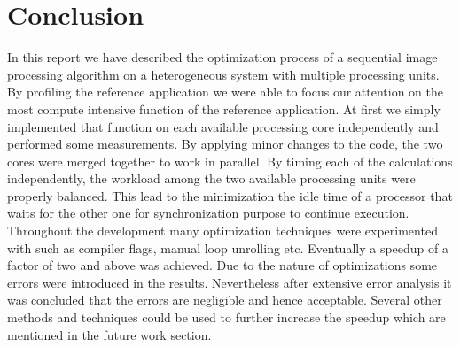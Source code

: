 \section{Conclusion}
\label{sec:Conclusion}
 In this report we have described the optimization process of a sequential image processing algorithm on a heterogeneous system with multiple processing units.
By profiling the reference application we were able to focus our attention on the most compute intensive function of the reference application.
At first we simply implemented that function on each available processing core independently and performed some measurements. By applying minor changes to the code, the two cores were merged together to work in parallel.
By timing each of the calculations independently, the workload among the two available processing units were properly balanced.
This lead to the minimization the idle time of a processor that waits for the other one for synchronization purpose to continue execution.
Throughout the development many optimization techniques were experimented with such as compiler flags, manual loop unrolling etc.
Eventually a speedup of a factor of two and above was achieved. Due to the nature of optimizations some errors were introduced in the results. Nevertheless after extensive error analysis it was concluded that the errors are negligible and hence acceptable. Several other methods and techniques could be used to further increase the speedup which are mentioned in the future work section.
